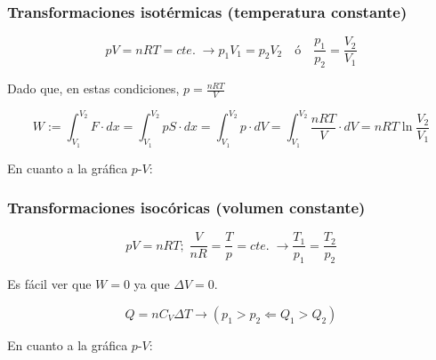 \documentclass[10pt]{article}
\begin{document}
\subsubsection{Transformaciones isotérmicas (temperatura constante)}

\[ pV = nRT = cte. \; \to p_1V_1 = p_2V_2 \quad \text{ó} \quad \frac{p_1}{p_2} = \frac{V_2}{V_1} \]

Dado que, en estas condiciones, $ p = \frac{n R T}{V} $

\[ W := \int_{V_1}^{V_2} F \cdot dx = \int_{V_1}^{V_2} pS \cdot dx = \int_{V_1}^{V_2} p\cdot dV = \int_{V_1}^{V_2} \frac{n R T}{V} \cdot dV = n R T \ln \frac{V_2}{V_1} \]

En cuanto a la gráfica $p$-$V$:

\begin{center}
\end{center}

\subsubsection{Transformaciones isocóricas (volumen constante)}

\[ pV = nRT; \; \frac{V}{nR} = \frac{T}{p} = cte. \; \to \frac{T_1}{p_1} = \frac{T_2}{p_2} \]

Es fácil ver que $ W = 0 $ ya que $ \Delta V = 0 $.

\[ Q = n C_V \Delta T \to (p_1 > p_2 \Leftarrow Q_1 > Q_2)\]

En cuanto a la gráfica $p$-$V$:

\begin{center}
\end{center}
\end{document}

